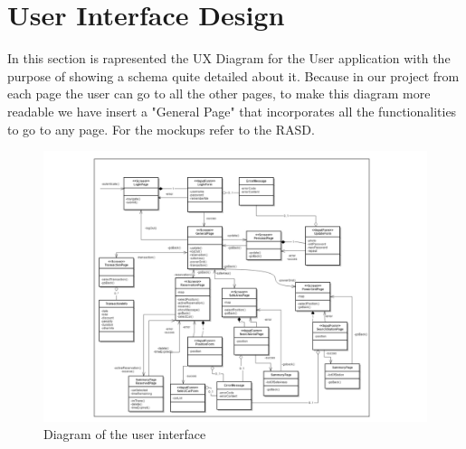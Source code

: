 \section{User Interface Design} \label{sec:user-interface}
In this section is rapresented the UX Diagram for the User application with the purpose of showing a schema quite detailed about it. Because in our project from each page the user can go to all the other pages, to make this diagram more readable we have insert a "General Page" that incorporates all the functionalities to go to any page. For the mockups refer to the RASD.
\begin{figure}[htbp]
\centering
\includegraphics[width=\textwidth]{Images/UxDiagram.pdf}
\vspace{10pt}
\caption{Diagram of the user interface}
\label{fig:user-interface}
\end{figure}
\clearpage
